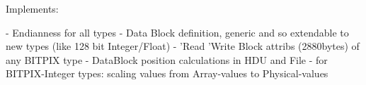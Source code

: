 


Implements:

- Endianness for all types
- Data Block definition, generic and so extendable to new types (like 128 bit Integer/Float)
- 'Read 'Write Block attribs (2880bytes) of any BITPIX type
- DataBlock position calculations in HDU and File
- for BITPIX-Integer types: scaling values from Array-values to Physical-values

